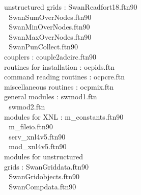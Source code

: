 \documentclass[12pt]{book}
\begin{document}
\begin{tabbing}
unstructured grids        \>:       SwanReadfort18.ftn90 \\
                          \> $\,\,$ SwanSumOverNodes.ftn90 \\
                          \> $\,\,$ SwanMinOverNodes.ftn90 \\
                          \> $\,\,$ SwanMaxOverNodes.ftn90 \\
                          \> $\,\,$ SwanPunCollect.ftn90 \\
couplers                  \>:       couple2adcirc.ftn90 \\
routines for installation \>:       ocpids.ftn \\
command reading routines  \>:       ocpcre.ftn \\
miscellaneous routines    \>:       ocpmix.ftn \\
general modules           \>:       swmod1.ftn \\
                          \> $\,\,$ swmod2.ftn \\
modules for XNL           \>:       m\_constants.ftn90 \\
                          \> $\,\,$ m\_fileio.ftn90 \\
                          \> $\,\,$ serv\_xnl4v5.ftn90 \\
                          \> $\,\,$ mod\_xnl4v5.ftn90 \\
modules for unstructured  \> $\,\,$ \\
grids                     \>:       SwanGriddata.ftn90 \\
                          \> $\,\,$ SwanGridobjects.ftn90 \\
                          \> $\,\,$ SwanCompdata.ftn90 \\
\end{tabbing}
\end{document}
